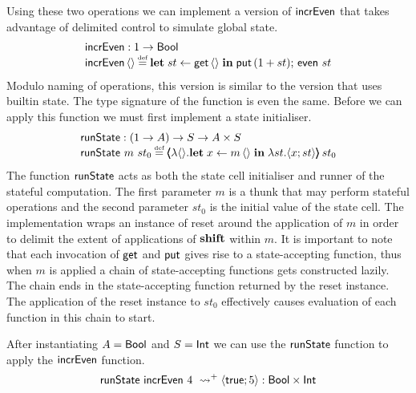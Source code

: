\documentclass[12pt,phd,lfcs,twoside,openright,logo,leftchapter,normalheadings]{infthesis}
\theoremstyle{plain}
\theoremstyle{definition}
\begin{document}
Using these two operations we can implement a version of $\mathsf{incrEven}$
that takes advantage of delimited control to simulate global state.
%
\[
  \bl
    \incrEven : \UnitType \to \Bool\\
    \incrEven\,\Unit \defas \Let\;st \revto \getF\,\Unit\;\In\;\putF\,(1 + st);\,\even~st
  \el
\]
%
Modulo naming of operations, this version is similar to the version
that uses builtin state. The type signature of the function is even
the same.
%
Before we can apply this function we must first implement a state
initialiser.
%
\[
  \bl
    \runState : (\UnitType \to A) \to S \to A \times S\\
    \runState~m~st_0 \defas \reset{\lambda\Unit.\Let\;x \revto m\,\Unit\;\In\;\lambda st. \Record{x;st}}\,st_0
      \bl
      \el
  \el
\]
%
The function $\mathsf{runState}$ acts as both the state cell initialiser and
runner of the stateful computation. The first parameter $m$ is a thunk
that may perform stateful operations and the second parameter $st_0$
is the initial value of the state cell. The implementation wraps an
instance of reset around the application of $m$ in order to delimit
the extent of applications of $\mathbf{shift}$ within $m$. It is important to
note that each invocation of $\mathsf{get}$ and $\mathsf{put}$ gives rise to a
state-accepting function, thus when $m$ is applied a chain of
state-accepting functions gets constructed lazily. The chain ends in
the state-accepting function returned by the reset instance. The
application of the reset instance to $st_0$ effectively causes
evaluation of each function in this chain to start.

After instantiating $A = \mathsf{Bool}$ and $S = \mathsf{Int}$ we can use the
$\mathsf{runState}$ function to apply the $\mathsf{incrEven}$ function.
%
\[
  \mathsf{runState}~\mathsf{incrEven}~4~ \leadsto^+ \langle \mathsf{true};5 \rangle : \mathsf{Bool} \times \mathsf{Int}
\]

\end{document}

